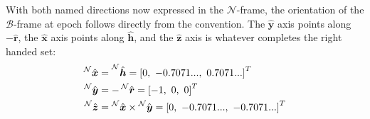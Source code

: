 \documentclass[titlepage]{article}
\begin{document}
With both named directions now expressed in the $\mathcal{N}$-frame, the orientation of the $\mathcal{B}$-frame at epoch follows directly from the convention. The $\hat{\boldsymbol{y}}$ axis points along $-\hat{\boldsymbol{r}}$, the $\hat{\boldsymbol{x}}$ axis points along $\hat{\boldsymbol{h}}$, and the $\hat{\boldsymbol{z}}$ axis is whatever completes the right handed set:
\begin{equation}
	\begin{split}
		\prescript{\mathcal{N}}{}{\hat{\boldsymbol{x}}}&=\prescript{\mathcal{N}}{}{\hat{\boldsymbol{h}}}=\left[0,\ -0.7071...,\ 0.7071...\right]^T \\
		\prescript{\mathcal{N}}{}{\hat{\boldsymbol{y}}}&=-\prescript{\mathcal{N}}{}{\hat{\boldsymbol{r}}}=\left[-1,\ 0,\ 0\right]^T \\
		\prescript{\mathcal{N}}{}{\hat{\boldsymbol{z}}}&=\prescript{\mathcal{N}}{}{\hat{\boldsymbol{x}}}\times\prescript{\mathcal{N}}{}{\hat{\boldsymbol{y}}}=\left[0,\ -0.7071...,\ -0.7071...\right]^T \\
	\end{split}
\end{equation}
\end{document}
